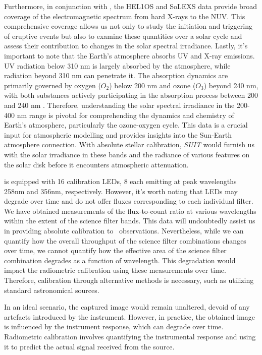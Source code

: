 Furthermore, in conjunction with \suit, the HEL1OS and SoLEXS data provide broad coverage of the electromagnetic spectrum from hard X-rays to the NUV. This comprehensive coverage allows us not only to study the initiation and triggering of eruptive events but also to examine these quantities over a solar cycle and assess their contribution to changes in the solar spectral irradiance. Lastly, it's important to note that the Earth's atmosphere absorbs UV and X-ray emissions. UV radiation below 310 nm is largely absorbed by the atmosphere, while radiation beyond 310 nm can penetrate it. The absorption dynamics are primarily governed by oxygen ($O_{2}$) below 200 nm and ozone ($O_{3}$) beyond 240 nm, with both substances actively participating in the absorption process between 200 and 240 nm \citep{haigh07}. Therefore, understanding the solar spectral irradiance in the 200-400 nm range is pivotal for comprehending the dynamics and chemistry of Earth's atmosphere, particularly the ozone-oxygen cycle. This data is a crucial input for atmospheric modelling and provides insights into the Sun-Earth atmosphere connection. With absolute stellar calibration, \textit{SUIT} would furnish us with the solar irradiance in these bands and the radiance of various features on the solar disk before it encounters atmospheric attenuation.

{\suit} is equipped with 16 calibration LEDs, 8 each emitting at peak wavelengths 258nm and 356nm, respectively. However, it's worth noting that LEDs may degrade over time and do not offer fluxes corresponding to each individual filter. We have obtained measurements of the flux-to-count ratio at various wavelengths within the extent of the science filter bands. This data will undoubtedly assist us in providing absolute calibration to \suit~observations. Nevertheless, while we can quantify how the overall throughput of the science filter combinations changes over time, we cannot quantify how the effective area of the science filter combination degrades as a function of wavelength. This degradation would impact the radiometric calibration using these measurements over time. Therefore, calibration through alternative methods is necessary, such as utilizing standard astronomical sources.

In an ideal scenario, the captured image would remain unaltered, devoid of any artefacts introduced by the instrument. However, in practice, the obtained image is influenced by the instrument response, which can degrade over time. Radiometric calibration involves quantifying the instrumental response and using it to predict the actual signal received from the source.

